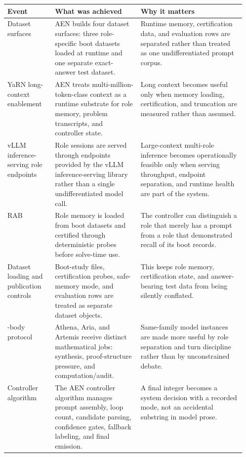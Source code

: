 \documentclass[11pt]{article}
\newcommand{\athena}{Athena}
\newcommand{\aria}{Aria}
\newcommand{\artemis}{Artemis}
\newcommand{\rab}{RAB}
\begin{document}
\begin{table}[p]
\centering
\scriptsize
\setlength{\tabcolsep}{4pt}
\renewcommand{\arraystretch}{1.08}
\begin{tabularx}{\textwidth}{@{}>{\raggedright\arraybackslash}p{0.20\linewidth}>{\raggedright\arraybackslash}p{0.36\linewidth}>{\raggedright\arraybackslash}X@{}}
\toprule
Event & What was achieved & Why it matters \\
\midrule
Dataset surfaces & AEN builds four dataset surfaces: three role-specific boot datasets loaded at runtime and one separate exact-answer test dataset. & Runtime memory, certification data, and evaluation rows are separated rather than treated as one undifferentiated prompt corpus. \\
YaRN long-context enablement & AEN treats multi-million-token-class context as a runtime substrate for role memory, problem transcripts, and controller state. & Long context becomes useful only when memory loading, certification, and truncation are measured rather than assumed. \\
vLLM inference-serving role endpoints & Role sessions are served through endpoints provided by the vLLM inference-serving library rather than a single undifferentiated model call. & Large-context multi-role inference becomes operationally feasible only when serving throughput, endpoint separation, and runtime health are part of the system. \\
\rab{} & Role memory is loaded from boot datasets and certified through deterministic probes before solve-time use. & The controller can distinguish a role that merely has a prompt from a role that demonstrated recall of its boot records. \\
Dataset loading and publication controls & Boot-study files, certification probes, safe-memory mode, and evaluation rows are treated as separate dataset objects. & This keeps role memory, certification state, and answer-bearing test data from being silently conflated. \\
3-body protocol & \athena{}, \aria{}, and \artemis{} receive distinct mathematical jobs: synthesis, proof-structure pressure, and computation/audit. & Same-family model instances are made more useful by role separation and turn discipline rather than by unconstrained debate. \\
Controller algorithm & The AEN controller algorithm manages prompt assembly, loop count, candidate parsing, confidence gates, fallback labeling, and final emission. & A final integer becomes a system decision with a recorded mode, not an accidental substring in model prose. \\

\end{tabularx}
\end{table}
\end{document}
